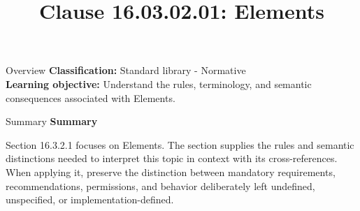 \documentclass[10pt,letterpaper]{article}
\title{Clause 16.03.02.01: Elements}
\author{}
\date{}
\begin{document}
\maketitle
\begin{CornellOverviewBox}{Overview}
\textbf{Classification:} Standard library - Normative\\[2pt]
\textbf{Learning objective:} Understand the rules, terminology, and semantic consequences associated with Elements.
\end{CornellOverviewBox}\begin{CornellSummaryBox}{Summary}
{\sffamily\bfseries\color{Accent} Summary}\par\vspace{3pt}Section 16.3.2.1 focuses on Elements. The section supplies the rules and semantic distinctions needed to interpret this topic in context with its cross-references. When applying it, preserve the distinction between mandatory requirements, recommendations, permissions, and behavior deliberately left undefined, unspecified, or implementation-defined.
\end{CornellSummaryBox}
\end{document}
